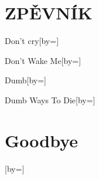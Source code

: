 \documentclass{article}
\begin{document}
\section{ZPĚVNÍK}

\begin{songs}{}












































\begin{song}{Don't cry}[by={}]
\beginverse

\endverse
\end{song}
\begin{song}{Don't Wake Me}[by={}]
\beginverse

\endverse
\end{song}
\begin{song}{Dumb}[by={}]
\beginverse

\endverse
\end{song}
\begin{song}{Dumb Ways To Die}[by={}]
\beginverse

\endverse
\end{song}





\section{Goodbye}
\begin{song}{}[by={}]
\beginverse


\end{song}
\end{songs}
\end{document}
